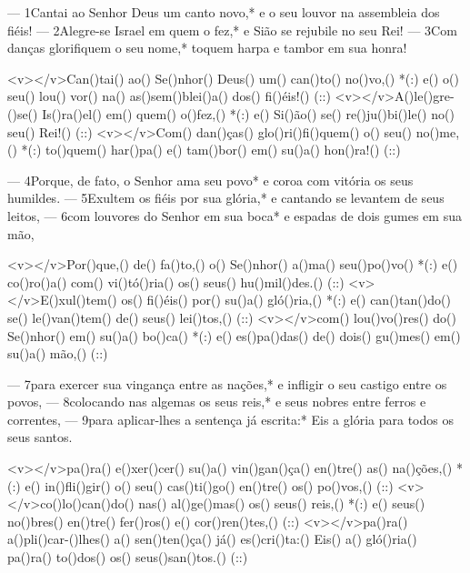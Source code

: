 — 1Cantai ao Senhor Deus um canto novo,*
e o seu louvor na assembleia dos fiéis!
— 2Alegre-se Israel em quem o fez,*
e Sião se rejubile no seu Rei!
— 3Com danças glorifiquem o seu nome,*
toquem harpa e tambor em sua honra!

<v></v>Can()tai() ao() Se()nhor() Deus() um() can()to() no()vo,() *(:)
e() o() seu() lou() vor() na() as()sem()blei()a() dos() fi()éis!() (::)
<v></v>A()le()gre-()se() Is()ra()el() em() quem() o()fez,() *(:)
e() Si()ão() se() re()ju()bi()le() no() seu() Rei!() (::)
<v></v>Com() dan()ças() glo()ri()fi()quem() o() seu() no()me,() *(:)
to()quem() har()pa() e() tam()bor() em() su()a() hon()ra!() (::)

— 4Porque, de fato, o Senhor ama seu povo*
e coroa com vitória os seus humildes.
— 5Exultem os fiéis por sua glória,*
e cantando se levantem de seus leitos,
— 6com louvores do Senhor em sua boca*
e espadas de dois gumes em sua mão,


<v></v>Por()que,() de() fa()to,() o() Se()nhor() a()ma() seu()po()vo() *(:)
e() co()ro()a() com() vi()tó()ria() os() seus() hu()mil()des.() (::)
<v></v>E()xul()tem() os() fi()éis() por() su()a() gló()ria,() *(:)
e() can()tan()do() se() le()van()tem() de() seus() lei()tos,() (::)
<v></v>com() lou()vo()res() do() Se()nhor() em() su()a() bo()ca() *(:)
e() es()pa()das() de() dois() gu()mes() em() su()a() mão,() (::)

— 7para exercer sua vingança entre as nações,*
e infligir o seu castigo entre os povos,
— 8colocando nas algemas os seus reis,*
e seus nobres entre ferros e correntes,
— 9para aplicar-lhes a sentença já escrita:*
Eis a glória para todos os seus santos.

<v></v>pa()ra() e()xer()cer() su()a() vin()gan()ça() en()tre() as() na()ções,() *(:)
e() in()fli()gir() o() seu() cas()ti()go() en()tre() os() po()vos,() (::)
<v></v>co()lo()can()do() nas() al()ge()mas() os() seus() reis,() *(:)
e() seus() no()bres() en()tre() fer()ros() e() cor()ren()tes,() (::)
<v></v>pa()ra() a()pli()car-()lhes() a() sen()ten()ça() já() es()cri()ta:()
Eis() a() gló()ria() pa()ra() to()dos() os() seus()san()tos.() (::)
